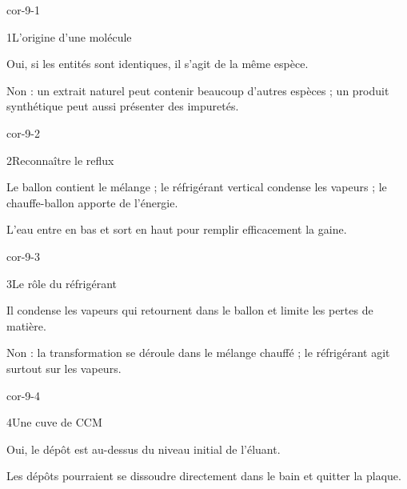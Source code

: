 \clearpage{}
\corrigesSouples
\begin{blocLivre}{cor-9-1}\begin{corrige}{1}{L’origine d’une molécule}
\begin{questions}
\item Oui, si les entités sont identiques, il s’agit de la même espèce.
\item Non : un extrait naturel peut contenir beaucoup d’autres espèces ; un produit synthétique peut aussi présenter des impuretés.
\end{questions}
\end{corrige}\end{blocLivre}
\begin{blocLivre}{cor-9-2}\begin{corrige}{2}{Reconnaître le reflux}
\begin{questions}
\item Le ballon contient le mélange ; le réfrigérant vertical condense les vapeurs ; le chauffe-ballon apporte de l’énergie.
\item L’eau entre en bas et sort en haut pour remplir efficacement la gaine.
\end{questions}
\end{corrige}\end{blocLivre}
\begin{blocLivre}{cor-9-3}\begin{corrige}{3}{Le rôle du réfrigérant}
\begin{questions}
\item Il condense les vapeurs qui retournent dans le ballon et limite les pertes de matière.
\item Non : la transformation se déroule dans le mélange chauffé ; le réfrigérant agit surtout sur les vapeurs.
\end{questions}
\end{corrige}\end{blocLivre}
\begin{blocLivre}{cor-9-4}\begin{corrige}{4}{Une cuve de CCM}
\begin{questions}
\item Oui, le dépôt est au-dessus du niveau initial de l’éluant.
\item Les dépôts pourraient se dissoudre directement dans le bain et quitter la plaque.
\end{questions}
\end{corrige}\end{blocLivre}
